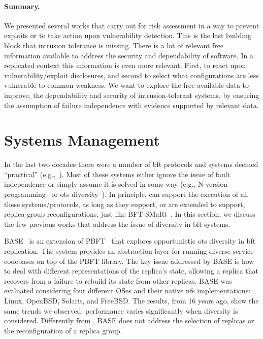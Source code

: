 \paragraph{Summary.} We presented several works that carry out for risk assessment in a way to prevent exploits or to take action upon vulnerability detection. 
This is the last building block that intrusion tolerance is missing. 
There is a lot of relevant free information available to address the security and dependability of software. 
In a replicated context this information is even more relevant. 
First, to react upon vulnerability/exploit disclosures, and second to select what configurations are less vulnerable to common weakness. 
We want to explore the free available data to improve, the dependability and security of intrusion-tolerant systems, by ensuring the assumption of failure independence with evidence supported by  relevant data.


\section{Systems Management}
\label{sec:XX}

In the last two decades there were a number of \gls{bft} protocols and systems deemed ``practical'' (e.g.,~\cite{Castro:2002,Kotla:2010,Veronese:2013,Aublin:2015,Behl:2015,Behl:2017,Liu:2016,Yin:2003}).
Most of these systems either ignore the issue of fault independence or simply assume it is solved in some way (e.g., N-version programming~\cite{Chen:1995} or \gls{ots} diversity~\cite{Gashi:2007,Garcia:2014}).
In principle, \system can support the execution of all these systems/protocols, as long as they support, or are extended to support, replica group reconfigurations, just like BFT-SMaRt~\cite{Bessani:2014}.
In this section, we discuss the few previous works that address the issue of diversity in \gls{bft} systems. 

BASE~\cite{Rodrigues:2001} is an extension of PBFT~\cite{Castro:1999} that explores opportunistic \gls{ots} diversity in \gls{bft} replication. 
The system provides an abstraction layer for running diverse service codebases on top of the PBFT library.
The key issue addressed by BASE is how to deal with different representations of the replica's state, allowing a replica that recovers from a failure to rebuild its state from other replicas. 
BASE was evaluated considering four different OSes and their native \gls{nfs} implementations: Linux, OpenBSD, Solaris, and FreeBSD.
The results, from 16 years ago, show the same trends we observed: performance varies significantly when diversity is considered.
Differently from \system, BASE does not address the selection of replicas or the reconfiguration of a replica group.

